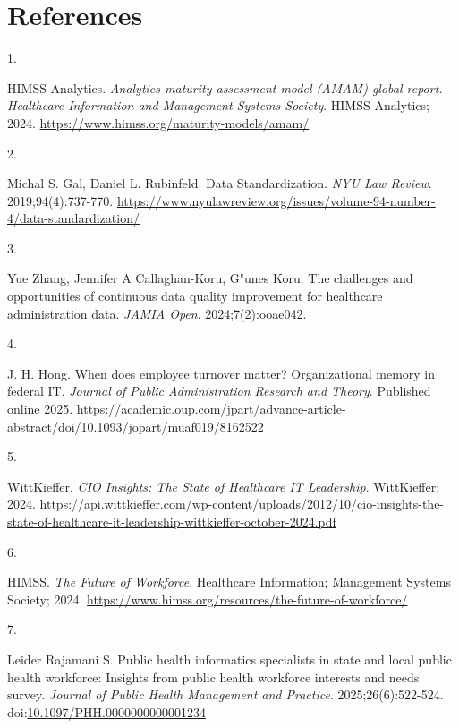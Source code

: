\documentclass[
  american,
  11pt,
  letterpaper,
  oneside  ,captions=tableheading
]{scrartcl}
\newlength{\cslhangindent}
\newlength{\csllabelwidth}
\newenvironment{CSLReferences}[2] %
 {\begin{list}{}{%
  \setlength{\itemindent}{0pt}
  \setlength{\leftmargin}{0pt}
  \setlength{\parsep}{0pt}
  \ifodd #1
   \setlength{\leftmargin}{\cslhangindent}
   \setlength{\itemindent}{-1\cslhangindent}
  \fi
  \setlength{\itemsep}{#2\baselineskip}}}
 {\end{list}}
\newcommand{\CSLLeftMargin}[1]{\parbox[t]{\csllabelwidth}{\strut#1\strut}}
\newcommand{\CSLRightInline}[1]{\parbox[t]{\linewidth - \csllabelwidth}{\strut#1\strut}}
\begin{document}
\section{References}\label{references}

\label{refs}
\begin{CSLReferences}{0}{1}
\CSLLeftMargin{1. }%
\CSLRightInline{HIMSS Analytics. \emph{{Analytics maturity assessment
model (AMAM) global report. Healthcare Information and Management
Systems Society}}. {HIMSS Analytics}; 2024.
\url{https://www.himss.org/maturity-models/amam/}}

\CSLLeftMargin{2. }%
\CSLRightInline{Michal S. Gal, Daniel L. Rubinfeld. {Data
Standardization}. \emph{NYU Law Review}. 2019;94(4):737-770.
\url{https://www.nyulawreview.org/issues/volume-94-number-4/data-standardization/}}

\CSLLeftMargin{3. }%
\CSLRightInline{Yue Zhang, Jennifer A Callaghan-Koru, G"unes Koru. {The
challenges and opportunities of continuous data quality improvement for
healthcare administration data}. \emph{JAMIA Open}. 2024;7(2):ooae042.}

\CSLLeftMargin{4. }%
\CSLRightInline{J. H. Hong. When does employee turnover matter?
Organizational memory in federal IT. \emph{Journal of Public
Administration Research and Theory}. Published online 2025.
\url{https://academic.oup.com/jpart/advance-article-abstract/doi/10.1093/jopart/muaf019/8162522}}

\CSLLeftMargin{5. }%
\CSLRightInline{WittKieffer. \emph{{CIO Insights: The State of
Healthcare IT Leadership}}. WittKieffer; 2024.
\url{https://api.wittkieffer.com/wp-content/uploads/2012/10/cio-insights-the-state-of-healthcare-it-leadership-wittkieffer-october-2024.pdf}}

\CSLLeftMargin{6. }%
\CSLRightInline{HIMSS. \emph{{The Future of Workforce}}. Healthcare
Information; Management Systems Society; 2024.
\url{https://www.himss.org/resources/the-future-of-workforce/}}

\CSLLeftMargin{7. }%
\CSLRightInline{Leider Rajamani S. {Public health informatics
specialists in state and local public health workforce: Insights from
public health workforce interests and needs survey}. \emph{Journal of
Public Health Management and Practice}. 2025;26(6):522-524.
doi:\href{https://doi.org/10.1097/PHH.0000000000001234}{10.1097/PHH.0000000000001234}}


\end{CSLReferences}
\end{document}
